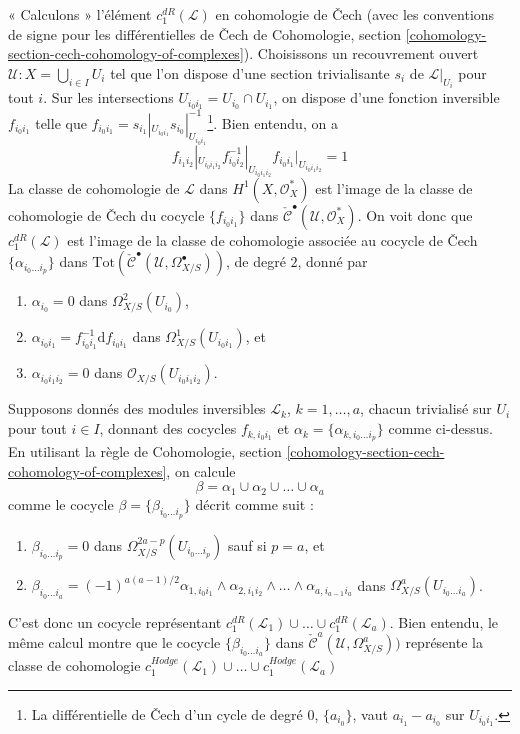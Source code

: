 \noindent
« Calculons » l'élément $c^{dR}_1(\mathcal{L})$ en cohomologie de {\v C}ech
(avec les conventions de signe pour les différentielles de {\v C}ech
de Cohomologie, section
\ref{cohomology-section-cech-cohomology-of-complexes}).
Choisissons un recouvrement ouvert
$\mathcal{U} : X = \bigcup_{i \in I} U_i$ tel que
l'on dispose d'une section trivialisante $s_i$ de $\mathcal{L}|_{U_i}$ pour tout $i$.
Sur les intersections $U_{i_0i_1} = U_{i_0} \cap U_{i_1}$,
on dispose d'une fonction inversible $f_{i_0i_1}$ telle que
$f_{i_0i_1} = s_{i_1}|_{U_{i_0i_1}} s_{i_0}|_{U_{i_0i_1}}^{-1}$\footnote{La
différentielle de {\v C}ech d'un cycle de degré $0$, $\{a_{i_0}\}$,
vaut $a_{i_1} - a_{i_0}$ sur $U_{i_0i_1}$.}.
Bien entendu, on a
$$
f_{i_1i_2}|_{U_{i_0i_1i_2}}
f_{i_0i_2}^{-1}|_{U_{i_0i_1i_2}}
f_{i_0i_1}|_{U_{i_0i_1i_2}} = 1
$$
La classe de cohomologie de $\mathcal{L}$ dans $H^1(X, \mathcal{O}_X^*)$ est
l'image de la classe de cohomologie de {\v C}ech du cocycle $\{f_{i_0i_1}\}$ dans
$\check{\mathcal{C}}^\bullet(\mathcal{U}, \mathcal{O}_X^*)$.
On voit donc que $c_1^{dR}(\mathcal{L})$ est l'image
de la classe de cohomologie associée au cocycle de {\v C}ech
$\{\alpha_{i_0 \ldots i_p}\}$ dans
$\text{Tot}(\check{\mathcal{C}}^\bullet(\mathcal{U}, \Omega_{X/S}^\bullet))$,
de degré $2$, donné par
\begin{enumerate}
\item $\alpha_{i_0} = 0$ dans $\Omega^2_{X/S}(U_{i_0})$,
\item $\alpha_{i_0i_1} = f_{i_0i_1}^{-1}\text{d}f_{i_0i_1}$ dans
$\Omega^1_{X/S}(U_{i_0i_1})$, et
\item $\alpha_{i_0i_1i_2} = 0$ dans $\mathcal{O}_{X/S}(U_{i_0i_1i_2})$.
\end{enumerate}
Supposons donnés des modules inversibles $\mathcal{L}_k$, $k = 1, \ldots, a$,
chacun trivialisé sur $U_i$ pour tout $i \in I$, donnant des cocycles
$f_{k, i_0i_1}$ et $\alpha_k = \{\alpha_{k, i_0 \ldots i_p}\}$ comme ci-dessus.
En utilisant la règle de
Cohomologie, section \ref{cohomology-section-cech-cohomology-of-complexes},
on calcule
$$
\beta = \alpha_1 \cup \alpha_2 \cup \ldots \cup \alpha_a
$$
comme le cocycle $\beta = \{\beta_{i_0 \ldots i_p}\}$
décrit comme suit :
\begin{enumerate}
\item $\beta_{i_0 \ldots i_p} = 0$ dans
$\Omega^{2a - p}_{X/S}(U_{i_0 \ldots i_p})$ sauf si $p = a$, et
\item $\beta_{i_0 \ldots i_a} = (-1)^{a(a - 1)/2}
\alpha_{1, i_0i_1} \wedge \alpha_{2, i_1 i_2} \wedge \ldots \wedge
\alpha_{a, i_{a - 1}i_a}$ dans
$\Omega^a_{X/S}(U_{i_0 \ldots i_a})$.
\end{enumerate}
C'est donc un cocycle représentant
$c_1^{dR}(\mathcal{L}_1) \cup \ldots \cup c_1^{dR}(\mathcal{L}_a)$.
Bien entendu, le même calcul montre que le cocycle
$\{\beta_{i_0 \ldots i_a}\}$ dans
$\check{\mathcal{C}}^a(\mathcal{U}, \Omega_{X/S}^a))$
représente la classe de cohomologie
$c_1^{Hodge}(\mathcal{L}_1) \cup \ldots \cup c_1^{Hodge}(\mathcal{L}_a)$

